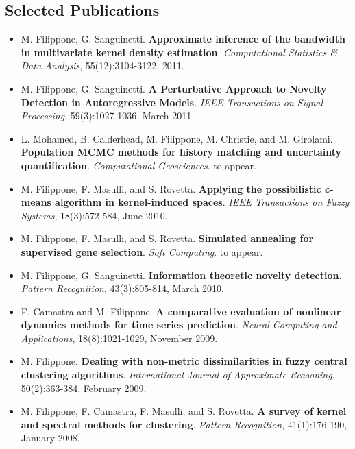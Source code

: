 \documentclass[a4paper,10pt]{article}
\begin{document}
\subsection*{Selected Publications}
\begin{itemize}
     \item  M. Filippone, G. Sanguinetti.
       \textbf{Approximate inference of the bandwidth in multivariate kernel density estimation}.
       \emph{Computational Statistics \& Data Analysis}, 55(12):3104-3122, 2011.
     \item  M. Filippone, G. Sanguinetti.
       \textbf{A Perturbative Approach to Novelty Detection in Autoregressive Models}.
       \emph{IEEE Transactions on Signal Processing}, 59(3):1027-1036, March 2011.
     \item L. Mohamed, B. Calderhead, M. Filippone, M. Christie, and M. Girolami.
       \textbf{Population MCMC methods for history matching and uncertainty quantification}.
       \emph{Computational Geosciences}. to appear.
     \item  M. Filippone, F. Masulli, and S. Rovetta.
       \textbf{Applying the possibilistic c-means algorithm in kernel-induced spaces}.
       \emph{IEEE Transactions on Fuzzy Systems}, 18(3):572-584, June 2010.
     \item  M. Filippone, F. Masulli, and S. Rovetta.
       \textbf{Simulated annealing for supervised gene selection}.
       \emph{Soft Computing}. to appear.
     \item  M. Filippone, G. Sanguinetti.
       \textbf{Information theoretic novelty detection}.
       \emph{Pattern Recognition}, 43(3):805-814, March 2010.
     \item  F. Camastra and M. Filippone.
       \textbf{A comparative evaluation of nonlinear dynamics methods for time series prediction}.
       \emph{Neural Computing and Applications}, 18(8):1021-1029, November 2009.
     \item  M. Filippone.
       \textbf{Dealing with non-metric dissimilarities in fuzzy central clustering algorithms}.
       \emph{International Journal of Approximate Reasoning}, 50(2):363-384, February 2009.
     \item  M. Filippone, F. Camastra, F. Masulli, and S. Rovetta.
       \textbf{A survey of kernel and spectral methods for clustering}.
       \emph{Pattern Recognition}, 41(1):176-190, January 2008.
\end{itemize}
\end{document}
